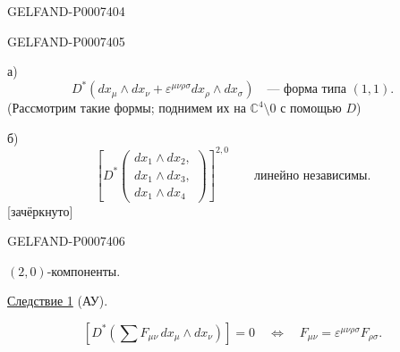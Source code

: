 \begin{GelfandAdjacentEvidence}{GELFAND-P000740}{4}

\end{GelfandAdjacentEvidence}
\begin{GelfandAdjacentEvidence}{GELFAND-P000740}{5}


а)
\[
D^*(dx_\mu\wedge dx_\nu+\varepsilon^{\mu\nu\rho\sigma}dx_\rho\wedge dx_\sigma)
\quad\text{--- форма типа }(1,1).
\]
(Рассмотрим такие формы; поднимем их на \(\mathbb C^4\setminus0\) с помощью \(D\))

б)
\[
\left[D^*\left(\begin{array}{l}
dx_1\wedge dx_2,\\
dx_1\wedge dx_3,\\
dx_1\wedge dx_4
\end{array}\right)\right]^{2,0}
\qquad\text{линейно независимы.}
\]
[зачёркнуто]
\end{GelfandAdjacentEvidence}
\begin{GelfandAdjacentEvidence}{GELFAND-P000740}{6}


\((2,0)\)-компоненты.

\underline{Следствие 1} (АУ).

\begin{equation*}
\tag*{(8)\hfill}
\left[D^*\left(\sum F_{\mu\nu}\,dx_\mu\wedge dx_\nu\right)\right]=0
\quad\Longleftrightarrow\quad
F_{\mu\nu}=\varepsilon^{\mu\nu\rho\sigma}F_{\rho\sigma}.
\end{equation*}
\end{GelfandAdjacentEvidence}



